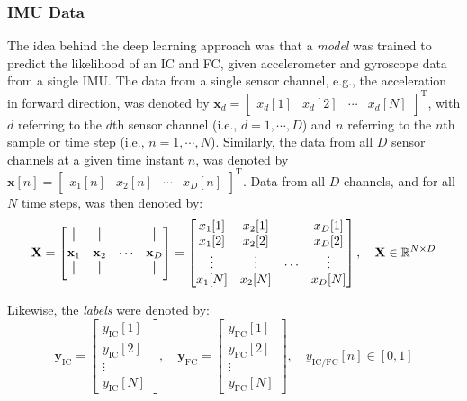 \documentclass[sensors,article,submit,pdftex,moreauthors]{Definitions/mdpi}
\begin{document}
\subsubsection{IMU Data}
The idea behind the deep learning approach was that a \emph{model} was trained to predict the likelihood of an IC and FC, given accelerometer and gyroscope data from a single IMU. The data from a single sensor channel, e.g., the acceleration in forward direction, was denoted by $\mathbf{x}_{d} = \begin{bmatrix}
	x_{d}[1] & x_{d}[2] & \cdots & x_{d}[N]
\end{bmatrix}^{\mathrm{T}}$, with $d$ referring to the $d$th sensor channel (i.e., $d = 1, \cdots, D$) and $n$ referring to the $n$th sample or time step (i.e., $n = 1, \cdots, N$). Similarly, the data from all $D$ sensor channels at a given time instant $n$, was denoted by $\mathbf{x}[n] = \begin{bmatrix}
x_{1}[n] & x_{2}[n] & \cdots & x_{D}[n]
\end{bmatrix}^{\mathrm{T}}$. Data from all $D$ channels, and for all $N$ time steps, was then denoted by:
\begin{equation}
	\mathbf{X} = \begin{bmatrix}
		\rule[0ex]{0.5pt}{2.5ex} & \rule[0ex]{0.5pt}{2.5ex} &  & \rule[0ex]{0.5pt}{2.5ex}\\
		\mathbf{x}_{1} & \mathbf{x}_{2} & \cdots & \mathbf{x}_{D}\\
		\rule[0ex]{0.5pt}{2.5ex} & \rule[0ex]{0.5pt}{2.5ex} &  & \rule[0ex]{0.5pt}{2.5ex}
	\end{bmatrix} = \begin{bmatrix}
		x_{1}[1] & x_{2}[1] & & x_{D}[1]\\
		x_{1}[2] & x_{2}[2] & & x_{D}[2]\\
		\vdots & \vdots & \cdots & \vdots\\
		x_{1}[N] & x_{2}[N] & & x_{D}[N]\end{bmatrix}, \quad \mathbf{X} \in \mathbb{R}^{N \times D}
	\label{eqn:train_data_single_instance}
\end{equation}

Likewise, the \emph{labels} were denoted by:
\begin{equation}
	\mathbf{y}_{\mathrm{IC}} = \begin{bmatrix}
		y_{\mathrm{IC}}[1]\\
		y_{\mathrm{IC}}[2]\\
		\vdots\\
		y_{\mathrm{IC}}[N]
	\end{bmatrix}, \quad \mathbf{y}_{\mathrm{FC}} = \begin{bmatrix}
		y_{\mathrm{FC}}[1]\\
		y_{\mathrm{FC}}[2]\\
		\vdots\\
		y_{\mathrm{FC}}[N]
	\end{bmatrix}, \quad y_{\mathrm{IC}/\mathrm{FC}}[n] \in [0, 1]
	\label{eqn:train_labels_single_instace}
\end{equation}
\end{document}
